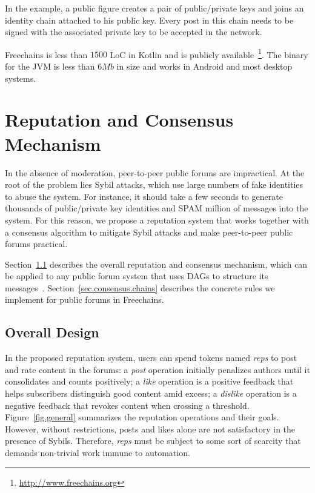 \documentclass[10pt,journal,compsoc]{IEEEtran}
\newcommand{\FC}       {Freechains\xspace}
\newcommand{\reps}     {\emph{reps}\xspace}
\begin{document}
In the example, a public figure creates a pair of public/private keys and joins
an identity chain attached to his public key.
Every post in this chain needs to be signed with the associated private key to
be accepted in the network.

\FC is less than $1500$ LoC in Kotlin and is publicly
available~\footnote{\url{http://www.freechains.org}}.
The binary for the JVM is less than $6Mb$ in size and works in Android and most
desktop systems.

\section{Reputation and Consensus Mechanism}
\label{sec.consensus}

In the absence of moderation, peer-to-peer public forums are impractical.
At the root of the problem lies Sybil attacks, which use large numbers of fake
identities to abuse the system.
For instance, it should take a few seconds to generate thousands of
public/private key identities and SPAM million of messages into the system.
For this reason, we propose a reputation system that works together with a
consensus algorithm to mitigate Sybil attacks and make peer-to-peer public
forums practical.

Section~\ref{sec.consensus.design} describes the overall reputation and
consensus mechanism, which can be applied to any public forum system that uses
DAGs to structure its messages~\cite{33,34,p2p.merkle-crdts}.
Section~\ref{sec.consensus.chains} describes the concrete rules we implement
for public forums in \FC.

\subsection{Overall Design}
\label{sec.consensus.design}

In the proposed reputation system, users can spend tokens named \reps to post
and rate content in the forums:
a \emph{post} operation initially penalizes authors until it consolidates and
counts positively;
a \emph{like} operation is a positive feedback that helps subscribers
distinguish good content amid excess;
a \emph{dislike} operation is a negative feedback that revokes content when
crossing a threshold.
Figure~\ref{fig.general} summarizes the reputation operations and their goals.
%
However, without restrictions, posts and likes alone are not satisfactory in
the presence of Sybils.
Therefore, \reps must be subject to some sort of scarcity that demands
non-trivial work immune to automation.
\end{document}
